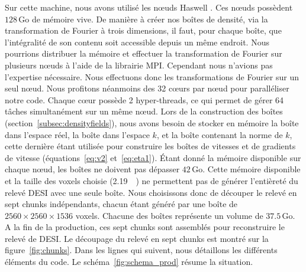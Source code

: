 Sur cette machine, nous avons utilisé les nœuds \og Haswell \fg.
Ces nœuds possèdent $\num{128}\,\mathrm{Go}$ de mémoire vive. De manière à créer nos boîtes de densité, via la transformation de Fourier à trois dimensions, il faut, pour chaque boîte, que l'intégralité de son contenu soit accessible depuis un même endroit.
Nous pourrions distribuer la mémoire et effectuer la transformation de Fourier sur plusieurs nœuds à l'aide de la librairie MPI.
Cependant nous n'avions pas l'expertise nécessaire. Nous effectuons donc les transformations de Fourier sur un seul nœud.
Nous profitons néanmoins des \num{32} cœurs par nœud pour paralléliser notre code. Chaque cœur possède 2 hyper-threads, ce qui permet de gérer 64 tâches simultanément sur un même nœud.
Lors de la construction des boîtes (section~\ref{subsec:densityfields}), nous avons besoin de stocker en mémoire la boîte dans l'espace réel, la boîte dans l'espace $k$, et la boîte contenant la norme de $k$, cette dernière étant utilisée pour construire les boîtes de vitesses et de gradients de vitesse (équations~\ref{eq:v2} et~\ref{eq:eta1}).
Étant donné la mémoire disponible sur chaque nœud, les boîtes ne doivent pas dépasser $\num{42}\,\mathrm{Go}$. Cette mémoire disponible et la taille des voxels choisie (\SI{2.19}{\perh\Mpc}) ne permettent pas de générer l'entièreté du relevé DESI avec une seule boîte.
Nous choisissons donc de découper le relevé en sept chunks indépendants, chacun étant généré par une boîte de $\num{2560}\times\num{2560}\times\num{1536}$ voxels. Chacune des boîtes représente un volume de $\num{37.5}\,\mathrm{Go}$. A la fin de la production, ces sept chunks sont assemblés pour reconstruire le relevé de DESI. Le découpage du relevé en sept chunks est montré sur la figure~\ref{fig:chunks}.
Dans les lignes qui suivent, nous détaillons les différents éléments du code.
Le schéma~\ref{fig:schema_prod} résume la situation.
